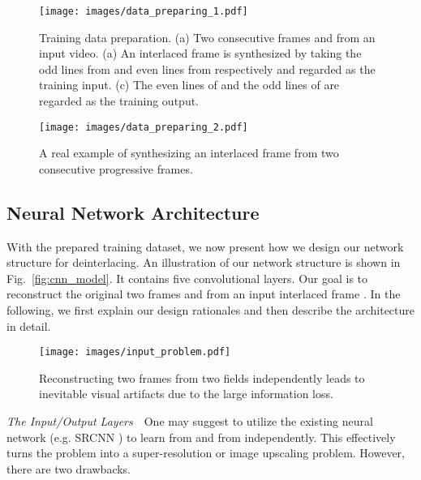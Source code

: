 \documentclass[acmtog]{acmart}
\begin{document}
\begin{figure}[!tp]
\texttt{[image: images/data\_preparing\_1.pdf]}\\
	\caption{Training data preparation. (a) Two consecutive frames  and  from an input video. (a) An interlaced frame  is synthesized by taking the odd lines from  and even lines from  respectively and regarded as the training input. (c) The even lines of  and the odd lines of  are regarded as the training output.}\label{fig:data_preparing}
\end{figure}

\begin{figure}[!tp]
\texttt{[image: images/data\_preparing\_2.pdf]}\\
	\caption{A real example of synthesizing an interlaced frame from two consecutive progressive frames.}\label{fig:data_preparing_real}
\end{figure}

\subsection{Neural Network Architecture}

With the prepared training dataset, we now present how we design our network
structure for deinterlacing. An illustration of our network structure is shown
in Fig.~\ref{fig:cnn_model}. It contains five convolutional layers. Our goal is
to reconstruct the original two frames  and 
from an input interlaced frame . In the following, we first explain
our  design rationales and then describe the architecture in
detail.

\begin{figure}[!tp]
	\centering
\texttt{[image: images/input\_problem.pdf]}\\
	\caption{Reconstructing two frames from two fields independently leads to inevitable visual artifacts due to the large information loss.}\label{fig:input_problem}
\end{figure}

\vspace{0.15in}
\noindent\emph{The Input/Output Layers}\,\,\,\,
One may suggest to utilize the existing neural network (e.g. SRCNN
\cite{dong2016image}) to learn  from
 and  from
 independently. This effectively turns the problem into 
a super-resolution or image upscaling problem.
However, there are two drawbacks.
\end{document}
